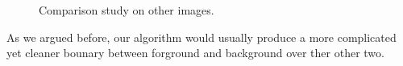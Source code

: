 \documentclass{article} %
\begin{document}
\begin{figure}[h]
\begin{center}
{}
\end{center}
\caption{Comparison study on other images.}
\label{fig-02_02}
\end{figure}

As we argued before, our algorithm would usually produce a more complicated yet cleaner bounary between forground and background over ther other two.



\end{document}
